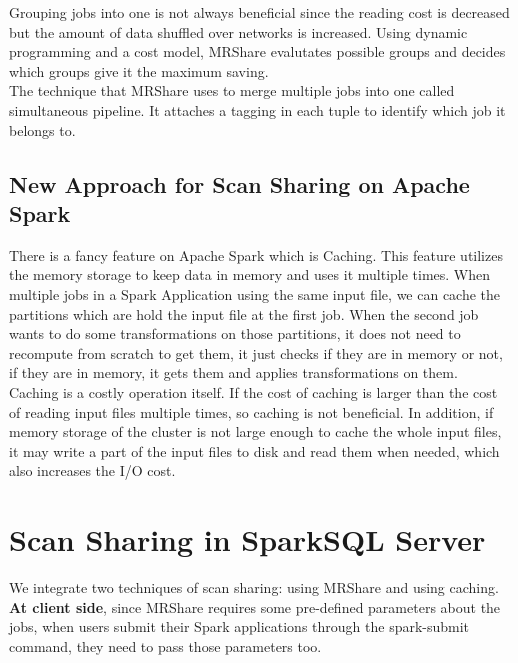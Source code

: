 Grouping jobs into one is not always beneficial since the reading cost is decreased but the amount of data shuffled over networks is increased. Using dynamic programming and a cost model, MRShare evalutates possible groups and decides which groups give it the maximum saving.\\
The technique that MRShare uses to merge multiple jobs into one called simultaneous pipeline. It attaches a tagging in each tuple to identify which job it belongs to.\\

\subsection{New Approach for Scan Sharing on Apache Spark}


There is a fancy feature on Apache Spark which is Caching. This feature utilizes the memory storage to keep data in memory and uses it multiple times. When multiple jobs in a Spark Application using the same input file, we can cache the partitions which are hold the input file at the first job. When the second job wants to do some transformations on those partitions, it does not need to recompute from scratch to get them, it just checks if they are in memory or not, if they are in memory, it gets them and applies transformations on them.\\

Caching is a costly operation itself. If the cost of caching is larger than the cost of reading input files multiple times, so caching is not beneficial. In addition, if memory storage of the cluster is not large enough to cache the whole input files, it may write a part of the input files to disk and read them when needed, which also increases the I/O cost.\\

\section{Scan Sharing in SparkSQL Server}
We integrate two techniques of scan sharing: using MRShare and using caching. \\
\textbf{At client side}, since MRShare requires some pre-defined parameters about the jobs, when users submit their Spark applications through the spark-submit command, they need to pass those parameters too.\\


